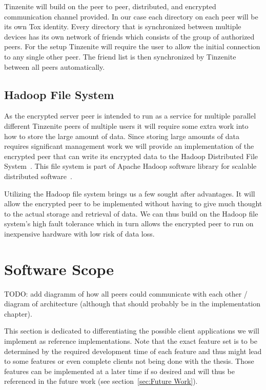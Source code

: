 Tinzenite will build on the peer to peer, distributed, and encrypted communication channel provided.
In our case each directory on each peer will be its own Tox identity.
Every directory that is synchronized between multiple devices has its own network of friends which consists of the group of authorized peers.
For the setup Tinzenite will require the user to allow the initial connection to any single other peer.
The friend list is then synchronized by Tinzenite between all peers automatically.

\subsection{Hadoop File System}
\label{sub:Hadoop File System}

As the encrypted server peer is intended to run as a service for multiple parallel different Tinzenite peers of multiple users it will require some extra work into how to store the large amount of data.
Since storing large amounts of data requires significant management work we will provide an implementation of the encrypted peer that can write its encrypted data to the Hadoop Distributed File System~\cite{borthakur2007hadoop}.
This file system is part of Apache Hadoop software library for scalable distributed software~\cite{web:site:hadoop}.

Utilizing the Hadoop file system brings us a few sought after advantages.
It will allow the encrypted peer to be implemented without having to give much thought to the actual storage and retrieval of data.
We can thus build on the Hadoop file system's high fault tolerance which in turn allows the encrypted peer to run on inexpensive hardware with low risk of data loss.

\section{Software Scope}
\label{sec:Software Scope}

TODO: add diagramm of how all peers could communicate with each other / diagram of architecture (although that should probably be in the implementation chapter).

This section is dedicated to differentiating the possible client applications we will implement as reference implementations.
Note that the exact feature set is to be determined by the required development time of each feature and thus might lead to some features or even complete clients not being done with the thesis.
Those features can be implemented at a later time if so desired and will thus be referenced in the future work (see section~\ref{sec:Future Work}).

